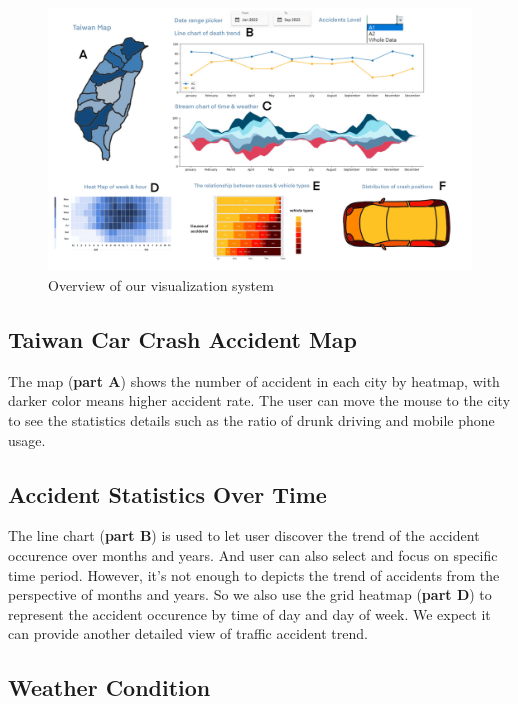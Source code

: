 \documentclass[a4paper, oneside, final, 12pt]{scrartcl} %
\begin{document}
\begin{figure}[t]
  \centering
  \includegraphics[width=\textwidth]{Image/overview_part.jpg}
  \caption{Overview of our visualization system}
  \label{fig:overview_part}
\end{figure}

\subsection{Taiwan Car Crash Accident Map}

The map (\textbf{part A}) shows the number of accident in each city
by heatmap, with darker color means higher accident rate.
The user can move the mouse to the city to see the statistics details
such as the ratio of drunk driving and mobile phone usage.

\subsection{Accident Statistics Over Time}

The line chart (\textbf{part B}) is used to let user discover the trend of the accident occurence
over months and years. And user can also select and focus on specific time period.
However, it's not enough to depicts the trend of accidents 
from the perspective of months and years.
So we also use the grid heatmap (\textbf{part D}) to represent 
the accident occurence by time of day and day of week.
We expect it can provide another detailed view of traffic accident trend.

\subsection{Weather Condition}
\end{document}
